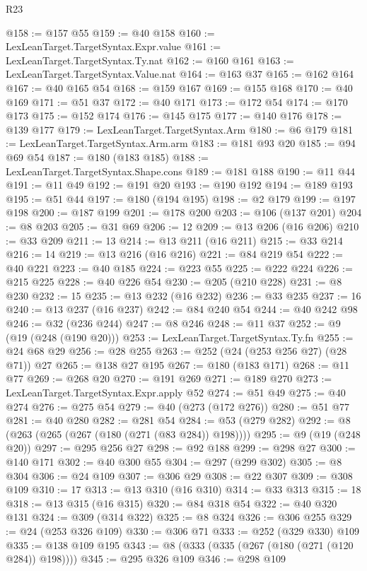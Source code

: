 \begin{lexlean}{R23}
\begin{coremodule}
@158 := @157 @55
@159 := @40 @158
@160 := LexLeanTarget.TargetSyntax.Expr.value
@161 := LexLeanTarget.TargetSyntax.Ty.nat
@162 := @160 @161
@163 := LexLeanTarget.TargetSyntax.Value.nat
@164 := @163 @37
@165 := @162 @164
@167 := @40 @165 @54
@168 := @159 @167
@169 := @155 @168
@170 := @40 @169
@171 := @51 @37
@172 := @40 @171
@173 := @172 @54
@174 := @170 @173
@175 := @152 @174
@176 := @145 @175
@177 := @140 @176
@178 := @139 @177
@179 := LexLeanTarget.TargetSyntax.Arm
@180 := @6 @179
@181 := LexLeanTarget.TargetSyntax.Arm.arm
@183 := @181 @93 @20
@185 := @94 @69 @54
@187 := @180 (@183 @185)
@188 := LexLeanTarget.TargetSyntax.Shape.cons
@189 := @181 @188
@190 := @11 @44
@191 := @11 @49
@192 := @191 @20
@193 := @190 @192
@194 := @189 @193
@195 := @51 @44
@197 := @180 (@194 @195)
@198 := @2 @179
@199 := @197 @198
@200 := @187 @199
@201 := @178 @200
@203 := @106 (@137 @201)
@204 := @8 @203
@205 := @31 @69
@206 := 12
@209 := @13 @206 (@16 @206)
@210 := @33 @209
@211 := 13
@214 := @13 @211 (@16 @211)
@215 := @33 @214
@216 := 14
@219 := @13 @216 (@16 @216)
@221 := @84 @219 @54
@222 := @40 @221
@223 := @40 @185
@224 := @223 @55
@225 := @222 @224
@226 := @215 @225
@228 := @40 @226 @54
@230 := @205 (@210 @228)
@231 := @8 @230
@232 := 15
@235 := @13 @232 (@16 @232)
@236 := @33 @235
@237 := 16
@240 := @13 @237 (@16 @237)
@242 := @84 @240 @54
@244 := @40 @242 @98
@246 := @32 (@236 @244)
@247 := @8 @246
@248 := @11 @37
@252 := @9 (@19 (@248 (@190 @20)))
@253 := LexLeanTarget.TargetSyntax.Ty.fn
@255 := @24 @68 @29
@256 := @28 @255
@263 := @252 (@24 (@253 @256 @27) (@28 @71)) @27
@265 := @138 @27 @195
@267 := @180 (@183 @171)
@268 := @11 @77
@269 := @268 @20
@270 := @191 @269
@271 := @189 @270
@273 := LexLeanTarget.TargetSyntax.Expr.apply @52
@274 := @51 @49
@275 := @40 @274
@276 := @275 @54
@279 := @40 (@273 (@172 @276))
@280 := @51 @77
@281 := @40 @280
@282 := @281 @54
@284 := @53 (@279 @282)
@292 := @8 (@263 (@265 (@267 (@180 (@271 (@83 @284)) @198))))
@295 := @9 (@19 (@248 @20))
@297 := @295 @256 @27
@298 := @92 @188
@299 := @298 @27
@300 := @140 @171
@302 := @40 @300 @55
@304 := @297 (@299 @302)
@305 := @8 @304
@306 := @24 @109
@307 := @306 @29
@308 := @22 @307
@309 := @308 @109
@310 := 17
@313 := @13 @310 (@16 @310)
@314 := @33 @313
@315 := 18
@318 := @13 @315 (@16 @315)
@320 := @84 @318 @54
@322 := @40 @320 @131
@324 := @309 (@314 @322)
@325 := @8 @324
@326 := @306 @255
@329 := @24 (@253 @326 @109)
@330 := @306 @71
@333 := @252 (@329 @330) @109
@335 := @138 @109 @195
@343 := @8 (@333 (@335 (@267 (@180 (@271 (@120 @284)) @198))))
@345 := @295 @326 @109
@346 := @298 @109

\end{coremodule}
\end{lexlean}
